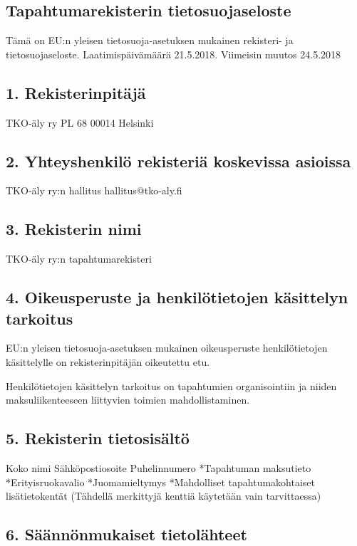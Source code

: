 \documentclass[finnish]{tktltiki}
\begin{document}
\pagestyle{empty}


\subsection*{Tapahtumarekisterin tietosuojaseloste}
Tämä on EU:n yleisen tietosuoja-asetuksen mukainen rekisteri- ja tietosuojaseloste.
Laatimispäivämäärä 21.5.2018. Viimeisin muutos 24.5.2018

\subsection*{1. Rekisterinpitäjä}
TKO-äly ry
PL 68
00014 Helsinki
\subsection*{2. Yhteyshenkilö rekisteriä koskevissa asioissa}

TKO-äly ry:n hallitus
hallitus@tko-aly.fi

\subsection*{3. Rekisterin nimi}

TKO-äly ry:n tapahtumarekisteri

\subsection*{4. Oikeusperuste ja henkilötietojen käsittelyn tarkoitus}

EU:n yleisen tietosuoja-asetuksen mukainen oikeusperuste henkilötietojen käsittelylle on
rekisterinpitäjän oikeutettu etu.

Henkilötietojen käsittelyn tarkoitus on tapahtumien organisointiin ja niiden maksuliikenteeseen liittyvien toimien mahdollistaminen.

\subsection*{5. Rekisterin tietosisältö}
Koko nimi
Sähköpostiosoite
Puhelinnumero
*Tapahtuman maksutieto
*Erityisruokavalio
*Juomamieltymys
*Mahdolliset tapahtumakohtaiset lisätietokentät
(Tähdellä merkittyjä kenttiä käytetään vain tarvittaessa)

\subsection*{6. Säännönmukaiset tietolähteet}
\end{document}
